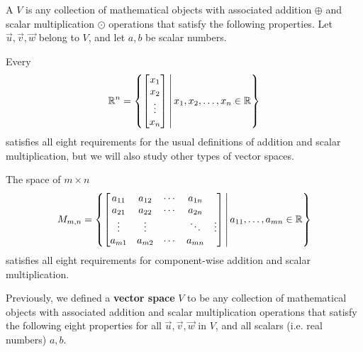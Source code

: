 \begin{definition}
  A  \(V\) is any collection of mathematical objects with
  associated addition \(\oplus\) and scalar multiplication \(\odot\)
  operations that satisfy the following properties. 
  Let \(\vec u,\vec v,\vec w\) belong to \(V\), and let \(a,b\) be scalar numbers.

  \vectorSpaceProperties
\end{definition}

\begin{observation}

  Every 
  \[
    \mathbb{R}^n=\left\{\begin{bmatrix}x_1\\x_2\\\vdots\\x_n\end{bmatrix}\,\middle|\,x_1,x_2,\dots,x_n\in\mathbb{R}\right\}
  \] 
  satisfies all eight requirements for the usual definitions of addition
  and scalar multiplication,
  but we will also study other types of vector spaces.
\end{observation}

\begin{observation}
The space of \(m \times n\)
  \[
    M_{m,n}=\left\{\begin{bmatrix}a_{11}  & a_{12} & \cdots & a_{1n} \\ a_{21} & a_{22} & \cdots & a_{2n} \\\vdots & \vdots & & \ddots & \vdots \\a_{m1} & a_{m2} & \cdots & a_{mn} \end{bmatrix}\,\middle|\,a_{11},\ldots,a_{mn} \in\mathbb{R}\right\}
  \] 
  satisfies all eight requirements for component-wise addition
  and scalar multiplication.
\end{observation}


\begin{remark}
  Previously, we defined a \textbf{vector space} \(V\) to be any collection of
  mathematical objects with
  associated addition and scalar multiplication operations that satisfy
  the following eight properties for all \(\vec u,\vec v,\vec w\) in \(V\),
  and all scalars (i.e. real numbers) \(a,b\).

  \vectorSpaceProperties
\end{remark}

